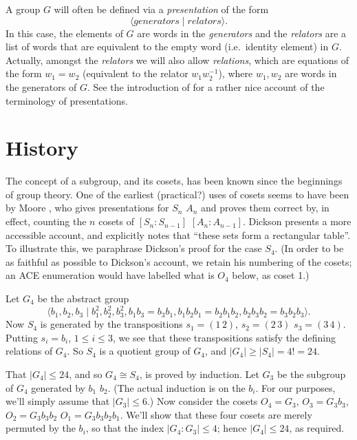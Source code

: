 A group $G$ will often be defined via a \emph{presentation} of the form
  $$\langle \textit{generators} \mid \textit{relators} \rangle.$$
In this case, the elements of $G$ are words in the \emph{generators}
  and the \emph{relators} are a list of words that are equivalent to 
  the empty word (i.e.~identity element) in $G$. 
Actually, amongst the \emph{relators} we will also allow \emph{relations},
  which are equations of the form $w_1 = w_2$ (equivalent to the relator 
  $w_1w_2^{-1}$), where $w_1, w_2$ are words in the generators of $G$.
See the introduction of \cite{MKS} for a rather nice account of the
  terminology of presentations.

\section{History}

The concept of a subgroup, and its cosets, has been known since the 
  beginnings of group theory.
One of the earliest (practical?) uses of cosets seems to have been by
  Moore \cite{Moo}, who gives presentations for $S_n$ \amp $A_n$ and
  proves them correct by, in effect, counting the $n$ cosets of 
  $[S_n:S_{n-1}]$ \amp $[A_n:A_{n-1}]$.
Dickson \cite[\S264]{Dic} presents a more accessible account, and 
  explicitly notes that ``these sets form a rectangular table''\kern-2pt.
%
To illustrate this, we paraphrase Dickson's proof for the case $S_4$.
(In order to be as faithful as possible to Dickson's account, we retain
his numbering of the cosets; an ACE enumeration would have labelled what
is $O_4$ below, as coset 1.)

Let $G_4$ be the abstract group
  $$ \langle b_1,b_2,b_3 \mid b_1^2,b_2^2,b_3^2,
       b_1b_3=b_3b_1, b_1b_2b_1=b_2b_1b_2,b_2b_3b_2=b_3b_2b_3 \rangle . $$
Now $S_4$ is generated by the transpositions $s_1=(1\,2)$, $s_2=(2\,3)$ \amp 
  $s_3=(3\,4)$.
Putting $s_i=b_i$, $1 \le i \le 3$, we see that these transpositions 
  satisfy the defining relations of $G_4$.
So $S_4$ is a quotient group of $G_4$, and $|G_4| \ge |S_4| = 4! = 24$.

That $|G_4| \le 24$, and so $G_4 \cong S_4$, is proved by induction.
Let $G_3$ be the subgroup of $G_4$ generated by $b_1$ \amp $b_2$.
(The actual induction is on the $b_i$.
For our purposes, we'll simply assume that $|G_3| \le 6$.)
Now consider the cosets $O_4=G_3$, $O_3=G_3b_3$, $O_2=G_3b_3b_2$ \amp 
  $O_1=G_3b_3b_2b_1$.
We'll show that these four cosets are merely permuted by the $b_i$, so
  that the index $|G_4 : G_3| \le 4$; hence $|G_4| \le 24$, as required.


